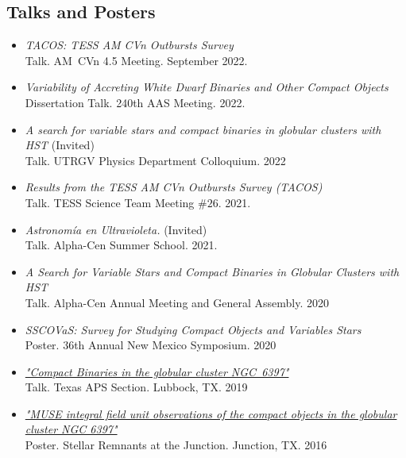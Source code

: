 \documentclass[letterpaper,10pt]{article}
\begin{document}
\subsection*{Talks and Posters}

\begin{itemize}[label=$\blacktriangleright$]

\item \textit{TACOS: TESS AM CVn Outbursts Survey} \\ Talk. AM~CVn 4.5 Meeting. September 2022.

\item \textit{Variability of Accreting White Dwarf Binaries and Other Compact Objects} \\ Dissertation Talk. 240th AAS Meeting. 2022.


\item \emph{A search for variable stars and compact binaries in globular clusters with HST} (Invited)\\
Talk. UTRGV Physics Department Colloquium. 2022


\item \textit{Results from the TESS AM CVn Outbursts Survey (TACOS)} \\ Talk. TESS Science Team Meeting $\#26$. 2021.


\item \textit{Astronom\'ia en Ultravioleta.} (Invited)\\ Talk. Alpha-Cen Summer School. 2021.

\item \textit{A Search for Variable Stars and Compact Binaries in Globular Clusters with HST}\\ Talk. Alpha-Cen Annual Meeting and General Assembly. 2020


\item \textit{SSCOVaS: Survey for Studying Compact Objects and Variables Stars}\\ Poster. 36th Annual New Mexico Symposium. 2020

\item \textit{\href{https://manuelpm.me/TexasAPS2019/}{"Compact Binaries in the globular cluster NGC~6397"}} \\Talk. Texas APS Section. Lubbock, TX. 2019



\item \textit{\href{http://manuelpm.me/papers/MUSEposter.pdf}{"MUSE integral field unit observations of the compact objects in the globular cluster NGC 6397"}} \\Poster. Stellar Remnants at the Junction. Junction, TX. 2016



\end{itemize}
\end{document}
